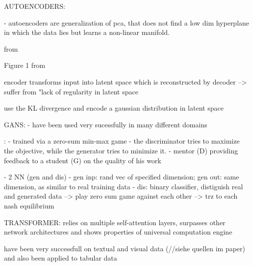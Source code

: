 AUTOENCODERS:

        - autoencoders are generalization of pca, that does not find a low dim hyperplane in which the data lies but learns a non-linear manifold.


        from \cite{kingma2013AutoEncodingVariationalBayes}
        
        Figure 1 from \cite{Bank2020Autoencoders}
        
        encoder transforms input into latent space which is reconstructed by decoder \cite{razghandi2022VariationalAutoencoderGenerativea}
        --> suffer from "lack of regularity in latent space \cite{razghandi2022VariationalAutoencoderGenerativea}
        
        use the KL divergence and encode a gaussian distribution in latent space \cite{razghandi2022VariationalAutoencoderGenerativea}


GANS:
\cite{goodfellow2020GenerativeAdversarialNetworks}
- have been used very sucessfully in many different domains \cite{li2022TTSGANTransformerbasedTimeSeries}
 

\cite{zhao2022CTABGANEnhancingTabular}:
- trained via a zero-sum min-max game 
- the discriminator tries to maximize the objective, while the generator tries to minimize it.
- mentor (D) providing feedback to a student (G) on the quality of his work


\cite{li2022TTSGANTransformerbasedTimeSeries}
- 2 NN (gen and dis)
- gen inp: rand vec of specified dimension; gen out: same dimension, as similar to real training data
- dis: binary classifier, distiguish real and generated data
--> play zero sum game against each other
--> trz to each nash equilibrium


TRANSFORMER:
relies on multiple self-attention layers, surpasses other network architectures and shows properties of universal computation engine \cite{li2022TTSGANTransformerbasedTimeSeries}

have been very successfull on textual and visual data (//siehe quellen im paper) \cite{borisov2022DeepNeuralNetworks} and also been applied to tabular data \cite{padhi2021TabularTransformersModeling} \cite{gorishniy2022EmbeddingsNumericalFeatures}




